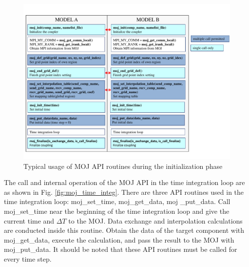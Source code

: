\documentclass[11pt,a4paper]{report}
\newcommand{\figref}[1]{Fig. \ref{#1}}
\begin{document}
\begin{figure}[H]
\begin{center}
\includegraphics[bb = 0 25 750 520, scale=0.59, clip]{figs/moj_usage_sample.pdf}
\caption{Typical usage of MOJ API routines during the initialization phase}
\label{fig:moj_usage_sample}
\end{center}
\end{figure}

The call and internal operation of the MOJ API in the time integration loop are as shown in \figref{fig:moj_time_integ}.
There are three API routines used in the time integration loop: moj\_set\_time, moj\_get\_data, moj \_put\_data.
Call moj\_set\_time near the beginning of the time integration loop and give the current time and $\Delta{T}$ to the MOJ.
Data exchange and interpolation calculations are conducted inside this routine.
Obtain the data of the target component with moj\_get\_data, execute the calculation, and pass the result to the MOJ with moj\_put\_data.
It should be noted that these API routines must be called for every time step.
\end{document}
